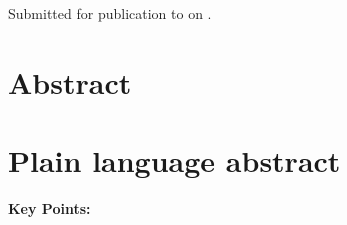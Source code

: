 \documentclass[onecolumn,12pt,a4paper]{article}
\begin{document}
\begin{FlushLeft}
    {\Large\bfseries \Title}
    \\[0.3cm]
    \Authors
    \\[0.3cm]
    {\Affiliations}
    \\[0.3cm]
    {Submitted for publication to \textit{\Journal{}} on \SubmittedOn.}
\end{FlushLeft}

\linenumbers

\section*{Abstract}



\section*{Plain language abstract}



\vspace{0.5cm}
\noindent
\textbf{Key Points:} \KeyPoints{}





\end{document}
